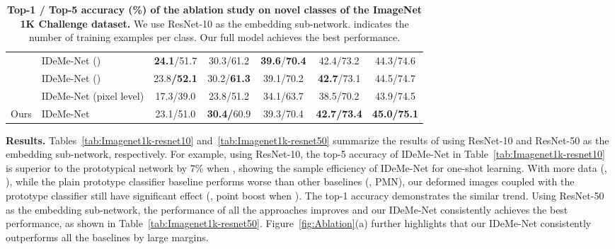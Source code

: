 \documentclass[10pt,letterpaper,twocolumn]{article}
\providecommand{\tabularnewline}{\\}
\begin{document}
\begin{table*}
\begin{centering}
\begin{tabular}{llccccc}
 & {\small{}{}{}{}{}{}IDeMe-Net ()  } & \textbf{\small{}{}{}{}{}{}{}24.1}{\small{}{}{}{}{}{}/{}51.7
 } & \textbf{\small{}{}{}{}{}{}}{\small{}{}{}{}{}{}30.3{}{}/{}61.2
 } & \textbf{\small{}{}{}{}{}{}{}39.6}{\small{}{}{}{}{}{}/}\textbf{\small{}{}{}{}{}{}{}70.4}{\small{}{}{}{}{}
 } & {\small{}{}{}{}{}{}42.4/{}73.2{}  } & {\small{}{}{}{}{}{}44.3/74.6}\tabularnewline
 & {\small{}{}{}{}{}{}IDeMe-Net ()  } & {\small{}{}{}{}{}{}{}23.8}\textbf{\small{}{}{}{}{}{}/{}52.1}{\small{}{}{}{}{}
 } & {\small{}{}{}{}{}{}30.2/}\textbf{\small{}{}{}{}{}{}{}61.3}{\small{}{}{}{}{}
 } & {\small{}{}{}{}{}{}39.1/70.2  } & {\small{}{}{}{}{}{}}\textbf{\small{}{}{}{}{}{}42.7}{\small{}{}{}{}{}/73.1
 } & \textbf{\small{}{}{}{}{}}{\small{}{}44.5{}/{}74.7}\tabularnewline
 & {\small{}{}{}{}{}{}IDeMe-Net (pixel level)  } & {\small{}{}{}{}{}{}17.3/39.0  } & {\small{}{}{}{}{}{}23.8/51.2  } & {\small{}{}{}{}{}{}34.1/63.7  } & {\small{}{}{}{}{}{}38.5/70.2  } & {\small{}{}{}{}{}{}43.9/74.5 }\tabularnewline
\hline 
{\small{}{}Ours  } & {\small{}{}{}{}{}{}IDeMe-Net  } & {\small{}{}{}{}{}23.1/51.0  } & \textbf{\small{}{}30.4{}/}{\small{}{}60.9  } & {\small{}{}{}{}{}{}39.3{}/{}70.4{}  } & \textbf{\small{}{}42.7/73.4}{\small{}{}  } & \textbf{\small{}{}{}{}{}{}45.0/75.1}\tabularnewline
\hline 
\end{tabular}
\par\end{centering}
\vspace{0.1in}
\caption{\textbf{\label{tab:resnet-10-imagenet1kablation}Top-1 / Top-5 accuracy (\%)
of the ablation study on novel classes of the ImageNet 1K Challenge dataset.}
We use ResNet-10 as the embedding sub-network.  indicates the number of training
examples per class. Our full model achieves the best performance.}



\end{table*}

\noindent \textbf{Results.} Tables~\ref{tab:Imagenet1k-resnet10}
and~\ref{tab:Imagenet1k-resnet50} summarize the results of using
ResNet-10 and ResNet-50 as the embedding sub-network, respectively.
For example, using ResNet-10, the top-5 accuracy of IDeMe-Net
in Table~\ref{tab:Imagenet1k-resnet10} is superior to the prototypical
network by 7\% when , showing the sample efficiency of IDeMe-Net
for one-shot learning. With more data (\eg, ), 
while the plain prototype classifier baseline performs worse than other baselines (\eg, PMN), 
our deformed images coupled with the prototype classifier still have significant effect (\eg,  point boost when ).
The top-1 accuracy 
demonstrates the similar trend.
Using ResNet-50 as the embedding sub-network, the performance of all
the approaches improves and our IDeMe-Net consistently achieves the
best performance, as shown in Table~\ref{tab:Imagenet1k-resnet50}. Figure~\ref{fig:Ablation}(a) further highlights that our IDeMe-Net
consistently outperforms all the baselines by large
margins.
\end{document}

